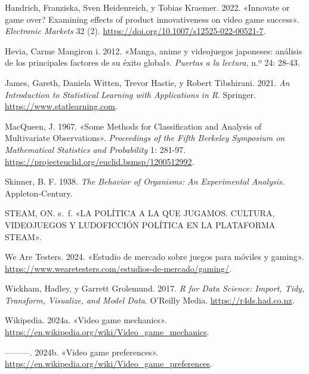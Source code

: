 \documentclass[
  letterpaper,
  DIV=11,
  numbers=noendperiod]{scrreprt}
\newlength{\cslhangindent}
\newenvironment{CSLReferences}[2] %
 {\begin{list}{}{%
  \setlength{\itemindent}{0pt}
  \setlength{\leftmargin}{0pt}
  \setlength{\parsep}{0pt}
  \ifodd #1
   \setlength{\leftmargin}{\cslhangindent}
   \setlength{\itemindent}{-1\cslhangindent}
  \fi
  \setlength{\itemsep}{#2\baselineskip}}}
 {\end{list}}
\begin{document}
\begin{CSLReferences}{1}{0}
Handrich, Franziska, Sven Heidenreich, y Tobias Kraemer. 2022.
{«Innovate or game over? Examining effects of product innovativeness on
video game success»}. \emph{Electronic Markets} 32 (2).
\url{https://doi.org/10.1007/s12525-022-00521-7}.

Hevia, Carme Mangiron i. 2012. {«Manga, anime y videojuegos japoneses:
análisis de los principales factores de su éxito global»}. \emph{Puertas
a la lectura}, n.º 24: 28-43.

James, Gareth, Daniela Witten, Trevor Hastie, y Robert Tibshirani. 2021.
\emph{An Introduction to Statistical Learning with Applications in R}.
Springer. \url{https://www.statlearning.com}.

MacQueen, J. 1967. {«Some Methods for Classification and Analysis of
Multivariate Observations»}. \emph{Proceedings of the Fifth Berkeley
Symposium on Mathematical Statistics and Probability} 1: 281-97.
\url{https://projecteuclid.org/euclid.bsmsp/1200512992}.

Skinner, B. F. 1938. \emph{The Behavior of Organisms: An Experimental
Analysis}. Appleton-Century.

STEAM, ON. s.~f. {«LA POLÍTICA A LA QUE JUGAMOS. CULTURA, VIDEOJUEGOS Y
LUDOFICCIÓN POLÍTICA EN LA PLATAFORMA STEAM»}.

We Are Testers. 2024. {«Estudio de mercado sobre juegos para móviles y
gaming»}.
\url{https://www.wearetesters.com/estudios-de-mercado/gaming/}.

Wickham, Hadley, y Garrett Grolemund. 2017. \emph{R for Data Science:
Import, Tidy, Transform, Visualize, and Model Data}. O'Reilly Media.
\url{https://r4ds.had.co.nz}.

Wikipedia. 2024a. {«Video game mechanics»}.
\url{https://en.wikipedia.org/wiki/Video_game_mechanics}.

---------. 2024b. {«Video game preferences»}.
\url{https://en.wikipedia.org/wiki/Video_game_preferences}.

\end{CSLReferences}
\end{document}
